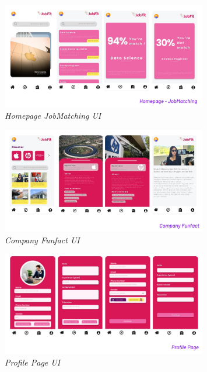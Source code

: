 \documentclass[journal,article,submit,pdftex,moreauthors]{Definitions/mdpi}
\begin{document}
\begin{figure}[H]
    \centering
    \includegraphics[width=0.8\textwidth]{image/homepage.jpeg}
    \captionsetup{justification=centering}
    \caption{\textit{Homepage JobMatching UI}}
    \label{fig:enter-label}
\end{figure}

\begin{figure}[H]
    \centering
    \includegraphics[width=0.8\textwidth]{image/funfact.jpeg}
    \captionsetup{justification=centering}
    \caption{\textit{Company Funfact UI}}
    \label{fig:enter-label}
\end{figure}

\begin{figure}[H]
    \centering
    \includegraphics[width=0.8\textwidth]{image/edit.jpeg}
    \captionsetup{justification=centering}
    \caption{\textit{Profile Page UI}}
    \label{fig:enter-label}
\end{figure}
\end{document}
